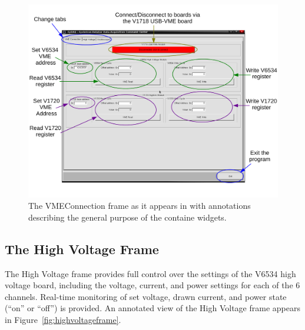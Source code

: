\begin{figure}[b]
  \centering
  \caption{The VMEConnection frame as it appears in
    \ADAQ with annotations describing the general
    purpose of the containe widgets.}
  \label{fig:vmeconnectionframe}
  \includegraphics[width=6in]{images/VMEConnectionFrame}
\end{figure}

\subsection{The High Voltage Frame}
The High Voltage frame provides full control over the settings of the
V6534 high voltage board, including the voltage, current, and power
settings for each of the 6 channels. Real-time monitoring of set
voltage, drawn current, and power state (``on'' or ``off'') is
provided. An annotated view of the High Voltage frame appears in
Figure~\ref{fig:highvoltageframe}.

